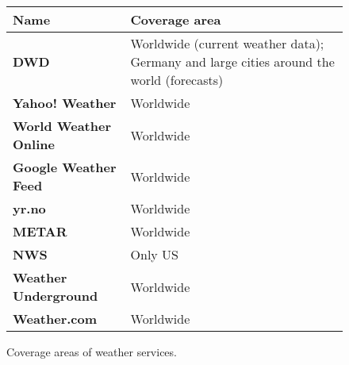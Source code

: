 \begin{figure}
\begin{longtable}{|p{}|p{}|}
  \hline
  \textbf{Name} & \textbf{Coverage area} \\
  \hline\hline
  \textbf{DWD} & Worldwide (current weather data); Germany and large cities around the world (forecasts) \\
  \hline
  \textbf{Yahoo! Weather} & Worldwide \\
  \hline
  \textbf{World Weather Online} & Worldwide \\
  \hline
  \textbf{Google Weather Feed} & Worldwide \\
  \hline
  \textbf{yr.no} & Worldwide \\
  \hline
  \textbf{METAR} & Worldwide \\
  \hline
  \textbf{NWS} & Only US \\
  \hline
  \textbf{Weather Underground} & Worldwide \\
  \hline
  \textbf{Weather.com} & Worldwide \\
  \hline
\end{longtable}
\vspace{.5em}
\caption{Coverage areas of weather services.}
\label{table:weather_data2}
\end{figure}

